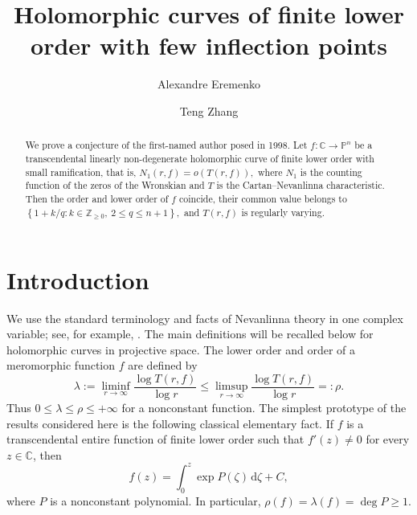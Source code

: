 \documentclass[12pt,letterpaper,reqno]{amsart}
\theoremstyle{definition}
\numberwithin{equation}{section}
\newcommand{\C}{\mathbb C}
\begin{document}
\title[Curves with few inflection points]{Holomorphic curves of finite lower order with few inflection points}
\author[A.~Eremenko]{Alexandre Eremenko}

\address{Mathematics Department, Purdue University,
	West Lafayette, IN 47907, USA}

\author[T.~Zhang]{Teng Zhang}
\address{School of Mathematics and Statistics, Xi'an Jiaotong University,
Xi'an 710049, P. R. China}
\date{}
\begin{abstract}
We prove a conjecture of the first-named author posed in 1998.
Let $f:\C\to\mathbb P^{n}$ be a transcendental linearly non-degenerate
holomorphic curve of finite lower order with small ramification,
that is,
$
N_1(r,f)=o(T(r,f)),
$
where $N_1$ is the counting function of the zeros of the Wronskian and
$T$ is the Cartan--Nevanlinna characteristic.
Then the order and lower order of $f$ coincide, their common value belongs to
$
\left\{1+k/q: k\in\mathbb Z_{\ge0},\ 2\le q\le n+1\right\},
$
and $T(r,f)$ is regularly varying.

\end{abstract}
\maketitle

\tableofcontents

\section{Introduction}\label{sec:intro}

We use the standard terminology and facts of Nevanlinna theory in
one complex variable; see, for example, \cite{Hay64}. The main definitions
will be recalled below for holomorphic curves in projective space.
The lower order and order of a meromorphic function $f$ are defined by
\[
 \lambda:=\liminf_{r\to\infty}\frac{\log T(r,f)}{\log r}
 \leq\limsup_{r\to\infty}\frac{\log T(r,f)}{\log r}=: \rho.
\]
Thus $0\leq\lambda\leq\rho\leq+\infty$ for a nonconstant function.
The simplest prototype of the results considered here is the following
classical elementary fact. If $f$ is a transcendental entire function of
finite lower order such that $f'(z)\ne0$ for every $z\in\C$, then
\[
 f(z)=\int_0^z\exp P(\zeta)\,\mathrm d\zeta+C,
\]
where $P$ is a nonconstant polynomial. In particular,
$
 \rho(f)=\lambda(f)=\deg P\geq1.
$
\end{document}
